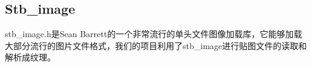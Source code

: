     



    \subsection{Stb\_image}
            \begin{spacing}{2.5}
            	    stb\_image.h是Sean Barrett的一个非常流行的单头文件图像加载库，它能够加载大部分流行的图片文件格式，我们的项目利用了stb\_image进行贴图文件的读取和解析成纹理。
            \end{spacing}


    

